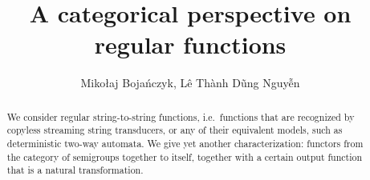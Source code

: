 \documentclass{article}
\begin{document}
\title{A categorical perspective on regular functions}
\author{Miko{\l}aj Boja\'nczyk, L{\^{e}} Th{\`{a}}nh D{\~u}ng Nguy{\~{\^e}}n}
\maketitle 
\begin{abstract}
    We consider regular string-to-string functions, i.e.~functions that are recognized by copyless streaming string transducers, or  any of their equivalent models, such as deterministic two-way automata. We give yet another characterization: functors from the  category of semigroups together to itself, together with a certain output function that is a natural transformation. 
\end{abstract}


\newcommand{\moncat}{\mathrm{Mon}}
\newcommand{\semcat}{\mathrm{Sem}}










\end{document}
